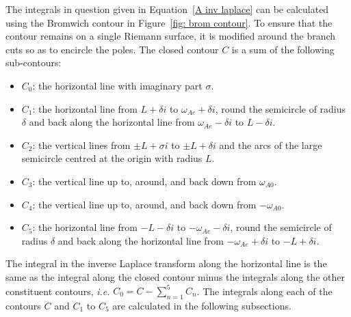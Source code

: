 The integrals in question given in Equation~\eqref{A inv laplace} can be calculated using the Bromwich contour in Figure~\ref{fig: brom contour}. To ensure that the contour remains on a single Riemann surface, it is modified around the branch cuts so as to encircle the poles. The closed contour $C$ is a sum of the following sub-contours:
\begin{itemize}
	\item $C_0$: the horizontal line with imaginary part $\sigma$.
	\item $C_1$: the horizontal line from $L + \delta i$ to $\omega_{Ae} + \delta i$, round the semicircle of radius $\delta$ and back along the horizontal line from $\omega_{Ae} - \delta i$ to $L - \delta i$.
	\item $C_2$: the vertical lines from $\pm L + \sigma i$ to $\pm L + \delta i$ and the arcs of the large semicircle centred at the origin with radius $L$.
	\item $C_3$: the vertical line up to, around, and back down from $\omega_{A0}$.
	\item $C_4$: the vertical line up to, around, and back down from $-\omega_{A0}$.
	\item $C_5$: the horizontal line from $-L - \delta i$ to $-\omega_{Ae} - \delta i$, round the semicircle of radius $\delta$ and back along the horizontal line from $-\omega_{Ae} + \delta i$ to $-L + \delta i$.
\end{itemize}
The integral in the inverse Laplace transform along the horizontal line is the same as the integral along the closed contour minus the integrals along the other constituent contours, \textit{i.e.} $C_0 = C - \sum_{n = 1}^{5}C_n$. The integrals along each of the contours $C$ and $C_1$ to $C_5$ are calculated in the following subsections.


